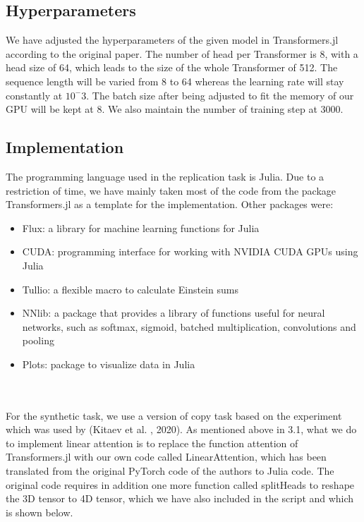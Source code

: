 \documentclass[DIV=13,fontsize=11pt]{scrartcl}
\begin{document}
\subsection{Hyperparameters}
We have adjusted the hyperparameters of the given model in Transformers.jl according to the original paper. The number of head per Transformer is 8, with a head size of 64, which leads to the size of the whole Transformer of 512. The sequence length will be varied from 8 to 64 whereas the learning rate will stay constantly at  \(10^-3\).  The batch size after being adjusted to fit the memory of our GPU will be kept at 8. We also maintain the number of training step at 3000.

\subsection{Implementation}
The programming language used in the replication task is Julia. Due to a restriction of time, we have mainly taken most of the code from the package Transformers.jl as a template for the implementation. Other packages were:
\begin{itemize}
    \item Flux: a library for machine learning functions for Julia
    \item CUDA: programming interface for working with NVIDIA CUDA GPUs using Julia
    \item Tullio: a flexible macro to calculate Einstein sums
    \item NNlib: a package that provides a library of functions useful for neural networks, such as softmax, sigmoid, batched multiplication, convolutions and pooling
    \item Plots: package to visualize data in Julia
\end{itemize} \\


\\ For the synthetic task, we use a version of copy task based on the experiment which was used by (Kitaev et al. , 2020). As mentioned above in 3.1, what we do to implement linear attention is to replace the function attention of Transformers.jl with our own code called LinearAttention, which has been translated from the original PyTorch code of the authors to Julia code. The original code requires in addition one more function called splitHeads to reshape the 3D tensor to 4D tensor, which we have also included in the script and which is shown below. 
\end{document}
